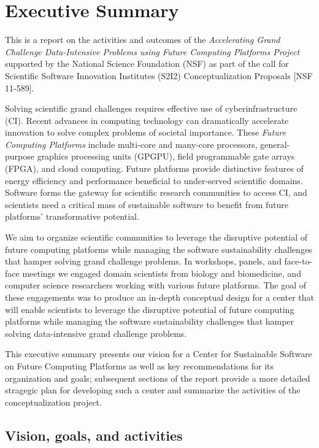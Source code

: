 \section{Executive Summary}
 This is a report on the activities and outcomes of the 
\textit{Accelerating Grand Challenge Data-Intensive 
Problems using Future Computing Platforms Project}
supported by the National Science Foundation (NSF) 
as part of the call for Scientific Software Innovation Institutes (S2I2) 
Conceptualization Proposals [NSF 11-589]. 

Solving scientific grand challenges requires effective use of cyberinfrastructure (CI).
Recent advances in computing technology can dramatically accelerate innovation 
to solve complex problems of societal importance. 
These \textit{Future Computing Platforms} include 
multi-core and many-core processors,
general-purpose graphics processing units (GPGPU),
field programmable gate arrays (FPGA), and
cloud computing. 
Future platforms provide distinctive features
of energy efficiency and performance beneficial 
to under-served scientific domains. 
Software forms the gateway for scientific research communities to access CI, 
and scientists need a critical mass of
sustainable software to benefit from future platforms’ transformative potential.


We aim to organize scientific communities to leverage the disruptive potential of future
computing platforms while managing the software sustainability challenges that hamper solving
grand challenge problems.
In workshops, panels, and face-to-face meetings we engaged
domain scientists from biology and biomedicine, 
and 
computer science researchers working with various future platforms.
The goal of these engagements 
was to produce an in-depth conceptual design for a center that will enable scientists to leverage the disruptive potential of future computing platforms while managing the software sustainability challenges that hamper solving data-intensive grand challenge problems.


This executive summary presents our vision for a Center for Sustainable Software on Future Computing Platforms as well as key recommendations for its organization and goals; subsequent sections of the report provide a more detailed stragegic plan for developing such a center and summarize the activities 
of the conceptualization project.

\subsection{Vision, goals, and activities}

